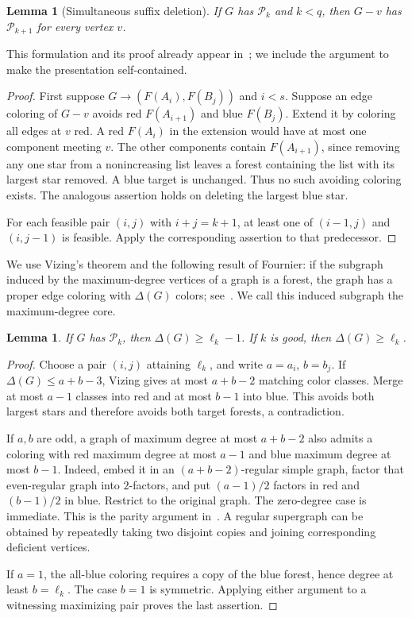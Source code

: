 \documentclass[11pt]{article}
\newtheorem{lemma}[theorem]{Lemma}
\theoremstyle{remark}\newtheorem{remark}[theorem]{Remark}
\begin{document}
\begin{lemma}[Simultaneous suffix deletion]\label{lem:delete}
If $G$ has $\mathcal P_k$ and $k<q$, then $G-v$ has $\mathcal P_{k+1}$ for every vertex $v$.
\end{lemma}
This formulation and its proof already appear in~\cite{rickyc}; we include the argument to make the presentation self-contained.
\begin{proof}
First suppose $G\to(F(A_i),F(B_j))$ and $i<s$. Suppose an edge coloring of $G-v$ avoids red $F(A_{i+1})$ and blue $F(B_j)$. Extend it by coloring all edges at $v$ red. A red $F(A_i)$ in the extension would have at most one component meeting $v$. The other components contain $F(A_{i+1})$, since removing any one star from a nonincreasing list leaves a forest containing the list with its largest star removed. A blue target is unchanged. Thus no such avoiding coloring exists. The analogous assertion holds on deleting the largest blue star.

For each feasible pair $(i,j)$ with $i+j=k+1$, at least one of $(i-1,j)$ and $(i,j-1)$ is feasible. Apply the corresponding assertion to that predecessor.
\end{proof}

We use Vizing's theorem and the following result of Fournier: if the subgraph induced by the maximum-degree vertices of a graph is a forest, the graph has a proper edge coloring with $\Delta(G)$ colors; see~\cite{HZ}. We call this induced subgraph the maximum-degree core.

\begin{lemma}\label{lem:degree}
If $G$ has $\mathcal P_k$, then $\Delta(G)\ge\ell_k-1$. If $k$ is good, then $\Delta(G)\ge\ell_k$.
\end{lemma}
\begin{proof}
Choose a pair $(i,j)$ attaining $\ell_k$, and write $a=a_i$, $b=b_j$. If $\Delta(G)\le a+b-3$, Vizing gives at most $a+b-2$ matching color classes. Merge at most $a-1$ classes into red and at most $b-1$ into blue. This avoids both largest stars and therefore avoids both target forests, a contradiction.

If $a,b$ are odd, a graph of maximum degree at most $a+b-2$ also admits a coloring with red maximum degree at most $a-1$ and blue maximum degree at most $b-1$. Indeed, embed it in an $(a+b-2)$-regular simple graph, factor that even-regular graph into $2$-factors, and put $(a-1)/2$ factors in red and $(b-1)/2$ in blue. Restrict to the original graph. The zero-degree case is immediate. This is the parity argument in~\cite[Lemma 2.1]{DJKR}. A regular supergraph can be obtained by repeatedly taking two disjoint copies and joining corresponding deficient vertices.

If $a=1$, the all-blue coloring requires a copy of the blue forest, hence degree at least $b=\ell_k$. The case $b=1$ is symmetric. Applying either argument to a witnessing maximizing pair proves the last assertion.
\end{proof}
\end{document}
